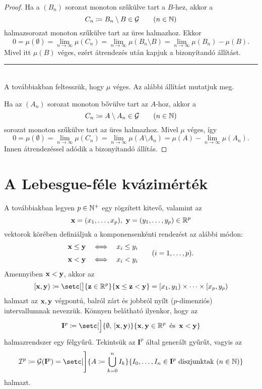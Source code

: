 \documentclass[
]{elteikthesis}[2024/04/26]
\begin{document}
\begin{proof}
		\fbox{\ref{eq:kvázimérték-jellemzése-04} \( \Longrightarrow \)
			  \ref{eq:kvázimérték-jellemzése-03}}
		Ha a \( (B_n) \) sorozat monoton szűkülve tart a \( B \)-hez, akkor a
		\[
			C_n \coloneq B_n \setminus B \in \mathcal{G} \qquad (n \in \mathbb{N})
		\]
		halmazsorozat monoton szűkülve tart az üres halmazhoz.
		Ekkor
		\[
			0 = 
			\mu( \emptyset ) =
			\lim_{n \to \infty} \mu( C_n ) =
			\lim_{n \to \infty} \mu( B_n \setminus B ) =
			\lim_{n \to \infty} \mu( B_n ) - \mu(B).
		\]
		Mivel itt \( \mu(B) \) véges, ezért átrendezés után kapjuk a bizonyítandó állítást.
		
		\noindent\rule{\linewidth}{0.4pt}\\
		
		A továbbiakban feltesszük, hogy \( \mu \) véges. Az alábbi állítást mutatjuk meg.
		
		\fbox{\ref{eq:kvázimérték-jellemzése-04} \( \Longrightarrow \)
			  \ref{eq:kvázimérték-jellemzése-02}}
		Ha az \( (A_n) \) sorozat monoton bővülve tart az \( A \)-hoz, akkor a
		\[
			C_n \coloneq A \setminus A_n \in \mathcal{G} \qquad (n \in \mathbb{N})
		\]
		sorozat monoton szűkülve tart az üres halmazhoz.
		Mivel \( \mu \) véges, így
		\[
			0 = 
			\mu( \emptyset ) =
			\lim_{n \to \infty} \mu( C_n ) =
			\lim_{n \to \infty} \mu( A \setminus A_n ) =
			\mu( A ) - \lim_{n \to \infty} \mu( A_n ).
		\]
		Innen átrendezéssel adódik a bizonyítandó állítás.
		
	\end{proof}
	
	\newpage
	\section{A Lebesgue-féle kvázimérték}
	
	A továbbiakban legyen \( p \in \mathbb{N}^+ \) egy rögzített kitevő, valamint az
	\[
		\vb{x} = (x_1, \dots, x_p), \ \vb{y} = (y_1, \dots, y_p) \in \mathbb{R}^p
	\]
	vektorok körében definiáljuk a komponensenkénti rendezést az alábbi módon:
	\[
		\begin{alignedat}{3}
			\x &\leq \y \quad &&\ratio \Longleftrightarrow \quad x_i &&\leq y_i \\[3pt]
			\x &<    \y \quad &&\ratio \Longleftrightarrow \quad x_i &&<    y_i
		\end{alignedat}
		\qquad (i = 1,\dots, p).
	\]
	Amennyiben \( \vb{x} < \vb{y} \), akkor az
	\[
		[\x, \y) \coloneq 
		\setc[\big]{ \vb{z} \in \R^p }{ \x \leq \vb{z} < \y } =
		[ x_1, y_1 ) \times \cdots \times [x_p, y_p )
	\]
	halmazt az \( \vb{x}, \vb{y} \) végpontú, balról zárt és jobbról nyílt (\( p \)-dimenziós) intervallumnak nevezzük. Könnyen belátható ilyenkor, hogy az
	\[
		\mathbf{I}^p \coloneq 
		\setc[\Big]{ \emptyset,\, [\x, \y) }{ \x, \y \in \R^p \,\text{ és }\, \x < \y }
	\]
	halmazrendszer egy félgyűrű. Tekintsük az \( \mathbf{I}^p \) által generált gyűrűt, vagyis az
	\[
		\mathcal{I}^p \coloneq 
		\mathcal{G}( \mathbf{I}^p ) =
		\setc[\Bigg]{ A \coloneq \bigcup_{k=0}^n I_k }
					{ I_0, \dots, I_n \in \mathbf{I}^p \text{ diszjunktak } (n \in \N) }
	\]
	halmazt.
	
\end{document}
